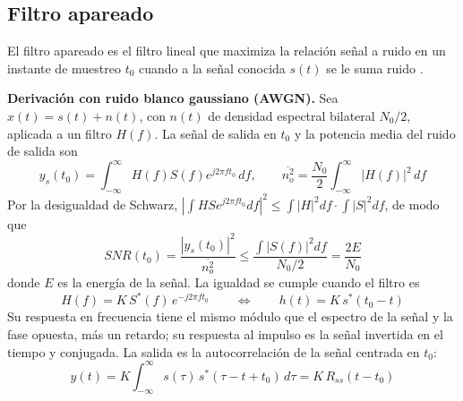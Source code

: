 \subsection{Filtro apareado}
\label{sec:filtro_apareado}

El filtro apareado es el filtro lineal que maximiza la relación señal a ruido en un instante de muestreo $t_0$ cuando a la señal conocida $s(t)$ se le suma ruido \cite{skolnik, richards}.

\textbf{Derivación con ruido blanco gaussiano (AWGN).} Sea $x(t) = s(t) + n(t)$, con $n(t)$ de densidad espectral bilateral $N_0/2$, aplicada a un filtro $H(f)$. La señal de salida en $t_0$ y la potencia media del ruido de salida son
\begin{equation}
    y_s(t_0) = \int_{-\infty}^{\infty} H(f) S(f) e^{j2\pi f t_0} \, df,
    \qquad
    \overline{n_o^2} = \frac{N_0}{2} \int_{-\infty}^{\infty} |H(f)|^2 \, df
\end{equation}
Por la desigualdad de Schwarz, $\left| \int H S e^{j2\pi f t_0} df \right|^2 \leq \int |H|^2 df \cdot \int |S|^2 df$, de modo que
\begin{equation}
    SNR(t_0) = \frac{|y_s(t_0)|^2}{\overline{n_o^2}} \leq \frac{\int |S(f)|^2 df}{N_0/2} = \frac{2E}{N_0}
\end{equation}
donde $E$ es la energía de la señal. La igualdad se cumple cuando el filtro es
\begin{equation}
    H(f) = K \, S^*(f) \, e^{-j2\pi f t_0}
    \qquad \Longleftrightarrow \qquad
    h(t) = K \, s^*(t_0 - t)
    \label{eq:matched}
\end{equation}
Su respuesta en frecuencia tiene el mismo módulo que el espectro de la señal y la fase opuesta, más un retardo; su respuesta al impulso es la señal invertida en el tiempo y conjugada. La salida es la autocorrelación de la señal centrada en $t_0$:
\begin{equation}
    y(t) = K \int_{-\infty}^{\infty} s(\tau) \, s^*(\tau - t + t_0) \, d\tau = K \, R_{ss}(t - t_0)
\end{equation}

